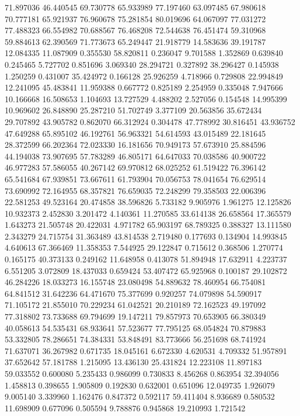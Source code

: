 71.897036
46.440545
69.730778
65.933989
77.197460
63.097485
67.980618
70.777181
65.921937
76.960678
75.281854
80.019696
64.067097
77.031272
77.488323
66.554982
70.688567
76.468208
72.544638
76.451474
59.310968
59.884613
62.390569
71.773673
65.249447
21.918779
14.583636
39.191787
12.084335
11.087909
0.355530
58.820811
0.236047
9.701588
1.352869
0.639840
0.245465
5.727702
0.851696
3.069340
28.294721
0.327892
38.296427
0.145938
1.250259
0.431007
35.424972
0.166128
25.926259
4.718966
0.729808
22.994849
12.241095
45.483841
11.959388
0.667772
0.825189
2.254959
0.335048
7.947666
10.166668
16.508653
1.104693
13.727529
4.488202
2.527056
0.154548
14.995399
10.969602
26.848890
25.287210
51.702749
3.377109
20.563856
35.672434
29.707892
43.905782
0.862070
66.312924
0.304478
47.778992
30.816451
43.936752
47.649288
65.895102
46.192761
56.963321
54.614593
43.015489
22.181645
28.372599
66.202364
72.023330
16.181656
70.949173
57.673910
25.884596
44.194038
73.907695
57.783289
46.805171
64.647033
70.038586
40.900722
46.977283
57.586055
40.267142
69.970812
68.025252
61.519422
76.396142
65.541684
67.939851
73.667611
61.793904
70.056753
78.041654
76.629514
73.690992
72.164955
68.357821
76.659035
72.248299
79.358503
22.006396
22.581253
49.523164
20.474858
38.596826
5.733182
9.905976
1.961275
12.125826
10.932373
2.452830
3.201472
4.140361
11.270585
33.614138
26.658564
17.365579
1.643273
21.505748
20.422031
4.971782
65.903197
68.789325
0.388327
13.111580
2.343279
24.715754
31.363489
43.814538
2.719480
0.177693
0.134904
14.993845
4.640613
67.366469
11.358353
7.544925
29.122847
0.715612
0.368506
1.270774
0.165175
40.373133
0.249162
11.648958
0.413078
51.894948
17.632911
4.223737
6.551205
3.072809
18.437033
0.659424
53.407472
65.925968
0.100187
29.102872
46.284226
18.033273
16.155748
23.080498
54.889632
78.460954
66.754081
64.841512
31.642236
64.471670
75.377699
0.920257
74.079898
54.590917
71.105172
21.855010
70.229234
61.042521
20.210189
72.162523
49.197092
77.318802
73.733688
69.794699
19.147211
79.857973
70.653905
66.380349
40.058613
54.535431
68.933641
57.523677
77.795125
68.054824
70.879883
53.332805
78.286651
74.384331
53.848491
83.773666
56.251698
68.741924
71.637071
36.267982
0.671735
18.045161
6.672330
4.620531
4.709332
51.957891
37.652642
57.181788
1.215095
13.436130
25.431824
12.223108
11.897183
59.033552
0.600080
5.235433
0.986099
0.730833
8.456268
0.863954
32.394056
1.458813
0.398655
1.905809
0.192830
0.632001
0.651096
12.049735
1.926079
9.005140
3.339960
1.162476
0.847372
0.592117
59.411404
8.936689
0.580532
11.698909
0.677096
0.505594
9.788876
0.945868
19.210993
1.721542
